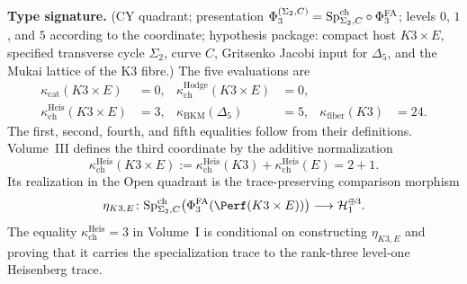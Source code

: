 \begin{theorem}
\label{thm:k3e-five-coordinate-computation}
\textbf{Type signature.} (CY quadrant; presentation
\(\Phi_3^{(\Sigma_2,C)}
=\mathrm{Sp}^{\mathrm{ch}}_{\Sigma_2,C}\circ\Phi^{\mathrm{FA}}_3\);
levels \(0\), \(1\), and \(5\) according to the coordinate;
hypothesis package: compact host \(K3\times E\),
specified transverse cycle \(\Sigma_2\), curve \(C\), Gritsenko
Jacobi input for \(\Delta_5\), and the Mukai lattice of the K3
fibre.)
The five evaluations are
\[
\begin{aligned}
\kappa_{\mathrm{cat}}(K3\times E)&=0,&
\kappa_{\mathrm{ch}}^{\mathrm{Hodge}}(K3\times E)&=0,\\
\kappa_{\mathrm{ch}}^{\mathrm{Heis}}(K3\times E)&=3,&
\kappa_{\mathrm{BKM}}(\Delta_5)&=5,&
\kappa_{\mathrm{fiber}}(K3)&=24.
\end{aligned}
\]
The first, second, fourth, and fifth equalities follow from their
definitions.  Volume~III defines the third coordinate by the additive
normalization
\[
\kappa_{\mathrm{ch}}^{\mathrm{Heis}}(K3\times E)
:=
\kappa_{\mathrm{ch}}^{\mathrm{Heis}}(K3)
+\kappa_{\mathrm{ch}}^{\mathrm{Heis}}(E)
=2+1.
\]
Its realization in the Open quadrant is the trace-preserving
comparison morphism
\[
\eta_{K3,E}\colon
\SpCh_{\Sigma_2,C}
\bigl(\PhiFA_3(\Perf(K3\times E))\bigr)
\longrightarrow \mathcal H_1^{\oplus3}.
\]
The equality \(\kappa_{\mathrm{ch}}^{\mathrm{Heis}}=3\) in Volume~I
is conditional on constructing \(\eta_{K3,E}\) and proving that it
carries the specialization trace to the rank-three level-one
Heisenberg trace.
\end{theorem}

